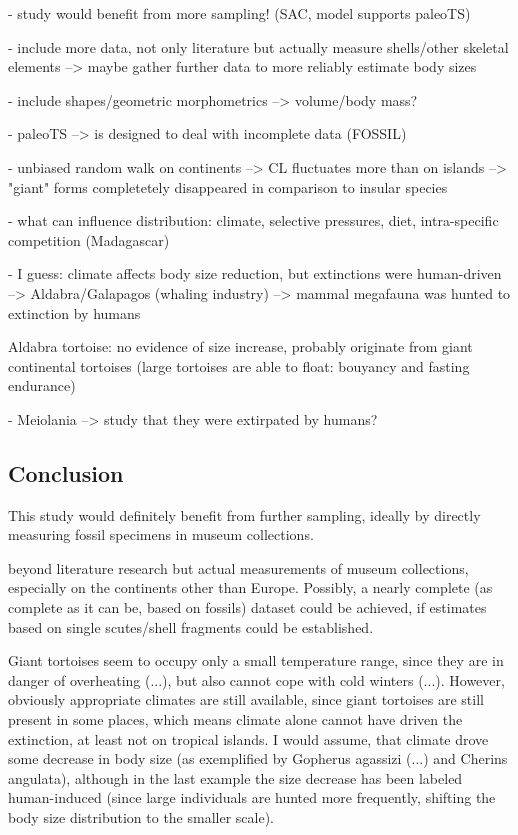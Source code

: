 - study would benefit from more sampling! (SAC, model supports paleoTS)

- include more data, not only literature but actually measure shells/other skeletal elements --> maybe gather further data to more reliably estimate body sizes

- include shapes/geometric morphometrics --> volume/body mass?

- paleoTS --> is designed to deal with incomplete data (FOSSIL)

- unbiased random walk on continents --> CL fluctuates more than on islands --> "giant" forms completetely disappeared in comparison to insular species

- what can influence distribution: climate, selective pressures, diet, intra-specific competition (Madagascar)

- I guess: climate affects body size reduction, but extinctions were human-driven
--> Aldabra/Galapagos (whaling industry)
--> mammal megafauna was hunted to extinction by humans





Aldabra tortoise: no evidence of size increase, probably originate from giant continental tortoises (large tortoises are able to float: bouyancy and fasting endurance)

- Meiolania --> study that they were extirpated by humans?

\subsection{Conclusion}


This study would definitely benefit from further sampling, ideally by directly measuring fossil specimens in museum collections.

beyond literature research but actual measurements of museum collections, especially on the continents other than Europe. Possibly, a nearly complete (as complete as it can be, based on fossils) dataset could be achieved, if estimates based on single scutes/shell fragments could be established.

Giant tortoises seem to occupy only a small temperature range, since they are in danger of overheating (...), but also cannot cope with cold winters (...). However, obviously appropriate climates are still available, since giant tortoises are still present in some places, which means climate alone cannot have driven the extinction, at least not on tropical islands.
I would assume, that climate drove some decrease in body size (as exemplified by Gopherus agassizi (...) and Cherins angulata), although in the last example the size decrease has been labeled human-induced (since large individuals are hunted more frequently, shifting the body size distribution to the smaller scale).



